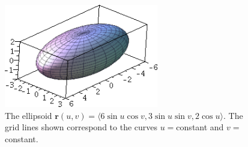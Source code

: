 \documentclass[12pt,letterpaper]{article}
\renewcommand{\r}{\mathbf{r}}
\begin{document}
\begin{figure}
\begin{center}
 \includegraphics[width=0.6\textwidth]{ellipsoid.png}
\end{center}
\caption{The ellipsoid $\r(u,v) = \langle 6\sin u\cos v, 3\sin u\sin v, 2\cos u\rangle$. The grid lines shown correspond to the curves $u=$constant and $v=$constant.}
\end{figure}
\end{document}
